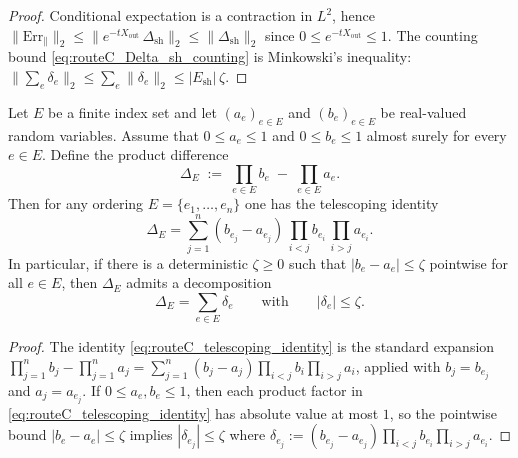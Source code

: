 \begin{proof}
Conditional expectation is a contraction in $L^2$, hence
\(
\|\mathrm{Err}_\parallel\|_2\le \|e^{-tX_{\mathrm{out}}}\,\Delta_{\mathrm{sh}}\|_2\le \|\Delta_{\mathrm{sh}}\|_2
\)
since $0\le e^{-tX_{\mathrm{out}}}\le 1$.
The counting bound \eqref{eq:routeC_Delta_sh_counting} is Minkowski's inequality:
\(\|\sum_e \delta_e\|_2\le\sum_e\|\delta_e\|_2\le |E_{\mathrm{sh}}|\,\zeta\).
\end{proof}



\begin{lemma}
\label{lem:routeC_shared_edge_telescoping}
Let $E$ be a finite index set and let $(a_e)_{e\in E}$ and $(b_e)_{e\in E}$ be real-valued random variables.
Assume that $0\le a_e\le 1$ and $0\le b_e\le 1$ almost surely for every $e\in E$.
Define the product difference
\begin{equation}\label{eq:routeC_telescoping_DeltaE_def}
\Delta_E\;:=\;\prod_{e\in E} b_e\; -\; \prod_{e\in E} a_e.
\end{equation}
Then for any ordering $E=\{e_1,\dots,e_n\}$ one has the telescoping identity
\begin{equation}\label{eq:routeC_telescoping_identity}
\Delta_E
=\sum_{j=1}^n (b_{e_j}-a_{e_j})\,\prod_{i<j} b_{e_i}\,\prod_{i>j} a_{e_i}.
\end{equation}
In particular, if there is a deterministic $\zeta\ge 0$ such that $|b_e-a_e|\le \zeta$ pointwise for all $e\in E$,
then $\Delta_E$ admits a decomposition
\begin{equation}\label{eq:routeC_telescoping_decomp}
\Delta_E=\sum_{e\in E} \delta_e
\qquad\text{with}\qquad
|\delta_e|\le \zeta.
\end{equation}
\end{lemma}

\begin{proof}
The identity \eqref{eq:routeC_telescoping_identity} is the standard expansion
\(
\prod_{j=1}^n b_j-\prod_{j=1}^n a_j=\sum_{j=1}^n (b_j-a_j)\prod_{i<j} b_i\prod_{i>j} a_i
\),
applied with $b_j=b_{e_j}$ and $a_j=a_{e_j}$.
If $0\le a_e,b_e\le 1$, then each product factor in \eqref{eq:routeC_telescoping_identity} has absolute value at most $1$,
so the pointwise bound $|b_e-a_e|\le\zeta$ implies $|\delta_{e_j}|\le\zeta$ where
\(
\delta_{e_j}:=(b_{e_j}-a_{e_j})\prod_{i<j} b_{e_i}\prod_{i>j} a_{e_i}
\).
\end{proof}

